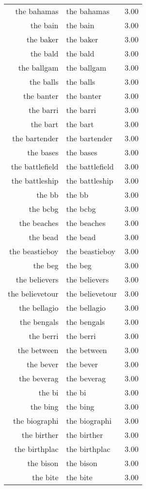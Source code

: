 \begin{table}[ht]
\begin{tabular}{rlr}
  the bahamas & the bahamas & 3.00 \\ 
  the bain & the bain & 3.00 \\ 
  the baker & the baker & 3.00 \\ 
  the bald & the bald & 3.00 \\ 
  the ballgam & the ballgam & 3.00 \\ 
  the balls & the balls & 3.00 \\ 
  the banter & the banter & 3.00 \\ 
  the barri & the barri & 3.00 \\ 
  the bart & the bart & 3.00 \\ 
  the bartender & the bartender & 3.00 \\ 
  the bases & the bases & 3.00 \\ 
  the battlefield & the battlefield & 3.00 \\ 
  the battleship & the battleship & 3.00 \\ 
  the bb & the bb & 3.00 \\ 
  the bcbg & the bcbg & 3.00 \\ 
  the beaches & the beaches & 3.00 \\ 
  the bead & the bead & 3.00 \\ 
  the beastieboy & the beastieboy & 3.00 \\ 
  the beg & the beg & 3.00 \\ 
  the believers & the believers & 3.00 \\ 
  the believetour & the believetour & 3.00 \\ 
  the bellagio & the bellagio & 3.00 \\ 
  the bengals & the bengals & 3.00 \\ 
  the berri & the berri & 3.00 \\ 
  the between & the between & 3.00 \\ 
  the bever & the bever & 3.00 \\ 
  the beverag & the beverag & 3.00 \\ 
  the bi & the bi & 3.00 \\ 
  the bing & the bing & 3.00 \\ 
  the biographi & the biographi & 3.00 \\ 
  the birther & the birther & 3.00 \\ 
  the birthplac & the birthplac & 3.00 \\ 
  the bison & the bison & 3.00 \\ 
  the bite & the bite & 3.00 \\ 

\end{tabular}
\end{table}
